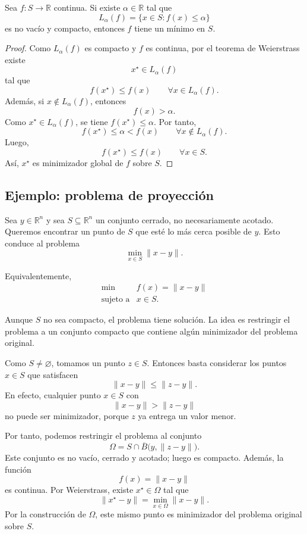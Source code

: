 \begin{theorem}
Sea \(f:S\to\mathbb{R}\) continua. Si existe \(\alpha\in\mathbb{R}\) tal que
\[
    L_\alpha(f)=\{x\in S:f(x)\leq \alpha\}
\]
es no vacío y compacto, entonces \(f\) tiene un mínimo en \(S\).
\end{theorem}

\begin{proof}
Como \(L_\alpha(f)\) es compacto y \(f\) es continua, por el teorema de Weierstrass existe
\[
    x^\star\in L_\alpha(f)
\]
tal que
\[
    f(x^\star)\leq f(x)
    \qquad
    \forall x\in L_\alpha(f).
\]
Además, si \(x\notin L_\alpha(f)\), entonces
\[
    f(x)>\alpha.
\]
Como \(x^\star\in L_\alpha(f)\), se tiene \(f(x^\star)\leq \alpha\). Por tanto,
\[
    f(x^\star)\leq \alpha < f(x)
    \qquad
    \forall x\notin L_\alpha(f).
\]
Luego,
\[
    f(x^\star)\leq f(x)
    \qquad
    \forall x\in S.
\]
Así, \(x^\star\) es minimizador global de \(f\) sobre \(S\).
\end{proof}

\subsection{Ejemplo: problema de proyección}

Sea \(y\in\mathbb{R}^n\) y sea \(S\subseteq\mathbb{R}^n\) un conjunto cerrado, no necesariamente acotado. Queremos encontrar un punto de \(S\) que esté lo más cerca posible de \(y\). Esto conduce al problema
\[
    \min_{x\in S}\|x-y\|.
\]

Equivalentemente,
\[
    \begin{array}{ll}
        \min & f(x)=\|x-y\|\\[1mm]
        \text{sujeto a} & x\in S.
    \end{array}
\]

Aunque \(S\) no sea compacto, el problema tiene solución. La idea es restringir el problema a un conjunto compacto que contiene algún minimizador del problema original.

Como \(S\neq\varnothing\), tomamos un punto \(z\in S\). Entonces basta considerar los puntos \(x\in S\) que satisfacen
\[
    \|x-y\|\leq \|z-y\|.
\]
En efecto, cualquier punto \(x\in S\) con
\[
    \|x-y\|>\|z-y\|
\]
no puede ser minimizador, porque \(z\) ya entrega un valor menor.

Por tanto, podemos restringir el problema al conjunto
\[
    \Omega
    =
    S\cap \overline{B}\bigl(y,\|z-y\|\bigr).
\]
Este conjunto es no vacío, cerrado y acotado; luego es compacto. Además, la función
\[
    f(x)=\|x-y\|
\]
es continua. Por Weierstrass, existe \(x^\star\in\Omega\) tal que
\[
    \|x^\star-y\|
    =
    \min_{x\in \Omega}\|x-y\|.
\]
Por la construcción de \(\Omega\), este mismo punto es minimizador del problema original sobre \(S\).

